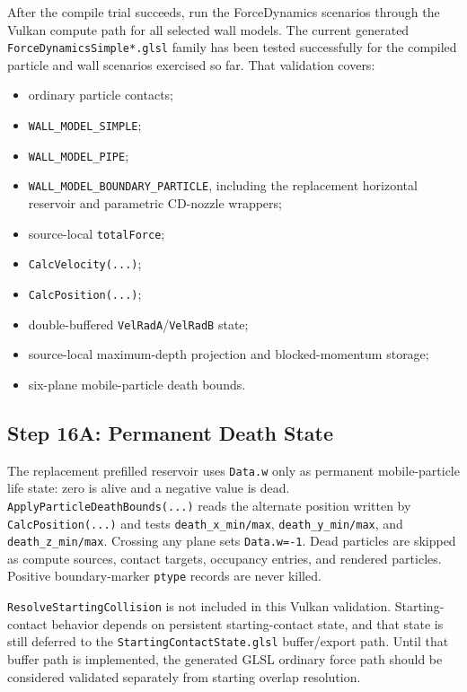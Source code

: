 After the compile trial succeeds, run the ForceDynamics scenarios through the
Vulkan compute path for all selected wall models.  The current generated
\texttt{ForceDynamicsSimple*.glsl} family has been tested successfully for the compiled
particle and wall scenarios exercised so far.  That validation covers:
\begin{itemize}
    \item ordinary particle contacts;
    \item \texttt{WALL\_MODEL\_SIMPLE};
    \item \texttt{WALL\_MODEL\_PIPE};
    \item \texttt{WALL\_MODEL\_BOUNDARY\_PARTICLE}, including the replacement
    horizontal reservoir and parametric CD-nozzle wrappers;
    \item source-local \texttt{totalForce};
    \item \texttt{CalcVelocity(...)};
    \item \texttt{CalcPosition(...)};
    \item double-buffered \texttt{VelRadA}/\texttt{VelRadB} state;
    \item source-local maximum-depth projection and blocked-momentum storage;
    \item six-plane mobile-particle death bounds.
\end{itemize}

\subsection{Step 16A: Permanent Death State}

The replacement prefilled reservoir uses \texttt{Data.w} only as permanent
mobile-particle life state: zero is alive and a negative value is dead.
\texttt{ApplyParticleDeathBounds(...)} reads the alternate position written by
\texttt{CalcPosition(...)} and tests \texttt{death\_x\_min/max},
\texttt{death\_y\_min/max}, and \texttt{death\_z\_min/max}.  Crossing any plane
sets \texttt{Data.w=-1}.  Dead particles are skipped as compute sources,
contact targets, occupancy entries, and rendered particles.  Positive
boundary-marker \texttt{ptype} records are never killed.

\texttt{ResolveStartingCollision} is not included in this Vulkan validation.
Starting-contact behavior depends on persistent starting-contact state, and
that state is still deferred to the \texttt{StartingContactState.glsl}
buffer/export path.  Until that buffer path is implemented, the generated GLSL
ordinary force path should be considered validated separately from starting
overlap resolution.

